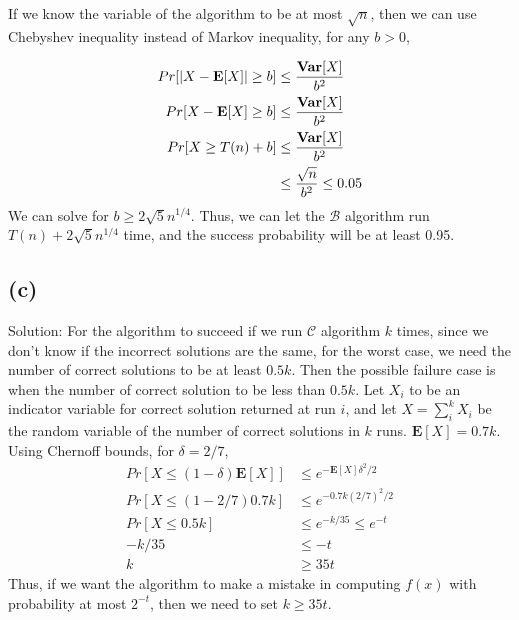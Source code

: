 \documentclass[11pt]{537homework}
\begin{document}
If we know the variable of the algorithm to be at most $\sqrt{n}$, then we can use Chebyshev inequality instead of Markov inequality, for any $b>0$,

\begin{align}
  Pr[ |X - \mathbf{E}[X]| \geq b] & \leq {\mathbf{Var}[X] \over b^2} \\
  Pr[ X - \mathbf{E}[X] \geq b]   & \leq {\mathbf{Var}[X] \over b^2} \\
  Pr[ X \geq T(n) + b]   & \leq {\mathbf{Var}[X] \over b^2} \\
                                  & \leq {\sqrt{n} \over b^2} \leq 0.05\\
\end{align}
We can solve for $b \geq 2\sqrt{5}n^{1/4}$. Thus, we can let the $\mathcal{B}$ algorithm run $T(n) + 2\sqrt{5}n^{1/4}$ time, and the success probability will be at least 0.95. 



\subsection*{(c)} 

Solution: For the algorithm to succeed if we run $\mathcal{C}$ algorithm $k$ times, since we don't know if the incorrect solutions are the same, for the worst case, we need the number of correct solutions to be at least $0.5k$. Then the possible failure case is when the number of correct solution to be less than $0.5k$. Let $X_i$ to be an indicator variable for correct solution returned at run $i$, and let $X = \sum_{i}^k X_i$ be the random variable of the number of correct solutions in $k$ runs. $\mathbf{E}[X] = 0.7k$. Using Chernoff bounds, for $\delta = 2/7$, 
\begin{align}
  Pr[X \leq (1-\delta)\mathbf{E}[X]]  & \leq e^{-\mathbf{E}[X]\delta^2/2} \\
  Pr[X \leq (1-2/7)0.7k]  & \leq e^{-0.7k(2/7)^2/2} \\
  Pr[X \leq 0.5k]         & \leq e^{-k/35} \leq e^{-t} \\
                    -k/35 & \leq -t \\
                        k & \geq 35t
\end{align}
Thus, if we want the algorithm to make a mistake in computing $f(x)$ with probability at most $2^{-t}$, then we need to set $k \geq 35t$. 
\end{document}
